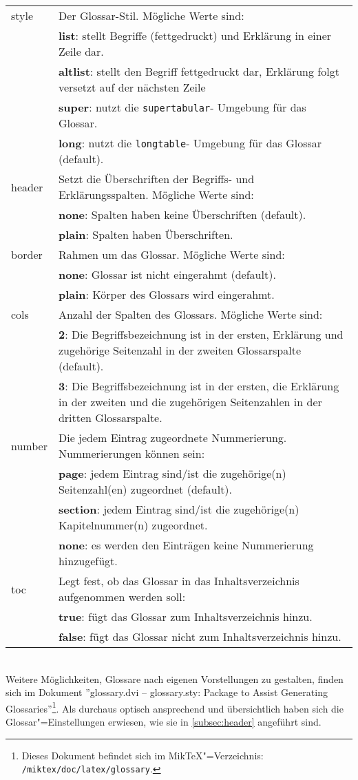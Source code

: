 \begin{tabularx}{\textwidth}{lX}
			style &Der Glossar-Stil. Mögliche Werte sind:\\
						&\textbf{list}: stellt Begriffe (fettgedruckt) und Erklärung in einer Zeile dar.\\
						&\textbf{altlist}: stellt den Begriff fettgedruckt dar, Erklärung folgt versetzt auf der nächsten Zeile\\
						&\textbf{super}: nutzt die \texttt{supertabular}- Umgebung für das Glossar.\\
						&\textbf{long}: nutzt die \texttt{longtable}- Umgebung für das Glossar (default).\\
			header &Setzt die Überschriften der Begriffs- und Erklärungsspalten. Mögliche Werte sind:\\
					  &\textbf{none}: Spalten haben keine Überschriften (default).\\
					  &\textbf{plain}: Spalten haben Überschriften.\\
		  border &Rahmen um das Glossar. Mögliche Werte sind:\\
		  			&\textbf{none}: Glossar ist nicht eingerahmt (default).\\
		  			&\textbf{plain}: Körper des Glossars wird eingerahmt.\\		  
			cols	& Anzahl der Spalten des Glossars. Mögliche Werte sind:\\ 
						&\textbf{2}: Die Begriffsbezeichnung ist in der ersten, Erklärung und zugehörige Seitenzahl in der zweiten Glossarspalte (default).\\ 
						&\textbf{3}: Die Begriffsbezeichnung ist in der ersten, die Erklärung in der zweiten und die zugehörigen Seitenzahlen in der dritten Glossarspalte.\\
		  number &Die jedem Eintrag zugeordnete Nummerierung. Nummerierungen können sein:\\
		  			&\textbf{page}: jedem Eintrag sind/ist die zugehörige(n) Seitenzahl(en) zugeordnet (default).\\
		  			&\textbf{section}: jedem Eintrag sind/ist die zugehörige(n) Kapitelnummer(n) zugeordnet.\\
		  			&\textbf{none}: es werden den Einträgen keine Nummerierung hinzugefügt.\\
		  toc &Legt fest, ob das Glossar in das Inhaltsverzeichnis aufgenommen werden soll:\\
		  		&\textbf{true}: fügt das Glossar zum Inhaltsverzeichnis hinzu.\\
		  		&\textbf{false}: fügt das Glossar nicht zum Inhaltsverzeichnis hinzu.
\end{tabularx}
\vspace{1em}
\\
Weitere Möglichkeiten, Glossare nach eigenen Vorstellungen zu gestalten, finden sich im
Dokument ''glossary.dvi -- glossary.sty: \DMLLaTeX{} Package to Assist Generating Glossaries''\footnote{Dieses Dokument befindet sich im Mik\TeX"=Verzeichnis: \verb~/miktex/doc/latex/glossary~.}. 
Als durchaus optisch ansprechend und übersichtlich haben sich die Glossar"=Einstellungen erwiesen, wie sie in \cref{subsec:header} angeführt sind.
